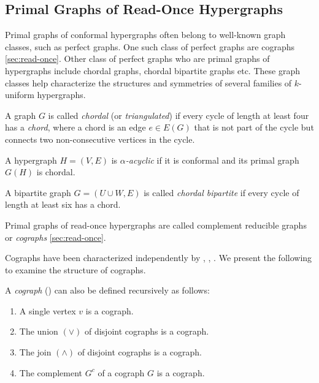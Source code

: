 \subsection{Primal Graphs of Read-Once Hypergraphs}

Primal graphs of conformal hypergraphs often belong to well-known graph classes, such as perfect graphs. One such class of perfect graphs are cographs \ref{sec:read-once}. Other class of perfect graphs who are primal graphs of hypergraphs include chordal graphs, chordal bipartite graphs etc. These graph classes help characterize the structures and symmetries of several families of $k$-uniform hypergraphs.

\begin{definition}\label{def:chordal}
A graph $G$ is called \emph{chordal} (or \emph{triangulated}) if every cycle of length at least four has a \emph{chord}, where a chord is an edge $e\in E(G)$ that is not part of the cycle but connects two non-consecutive vertices in the cycle.
\end{definition}

\begin{definition}
A hypergraph $H=(V,E)$ is \emph{$\alpha$-acyclic} if it is conformal and its primal graph $G(H)$ is chordal.
\end{definition}

\begin{definition}
A bipartite graph $G=(U\cup W,E)$ is called \emph{chordal bipartite} if every cycle of length at least six has a chord.
\end{definition}

Primal graphs of read-once hypergraphs are called complement reducible graphs or \emph{cographs} \ref{sec:read-once}.

Cographs have been characterized independently by \cite{CLB81}, \cite{Gc77}, \cite{KLN+93}. We present the following to examine the structure of cographs.

\begin{definition}
A \emph{cograph} () can also be defined recursively as follows: \cite{Cam22}
\begin{enumerate}
\item A single vertex $v$ is a cograph.
\item The union $(\vee)$ of disjoint cographs is a cograph.
\item The join $(\wedge)$ of disjoint cographs is a cograph.
\item The complement $G^c$ of a cograph $G$ is a cograph.
\end{enumerate}
\end{definition}

